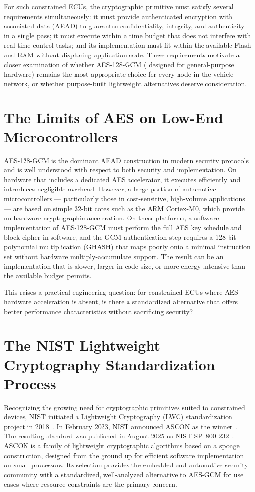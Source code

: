 For such constrained ECUs, the cryptographic primitive must satisfy several
requirements simultaneously: it must provide authenticated encryption with
associated data (AEAD) to guarantee confidentiality, integrity, and authenticity
in a single pass; it must execute within a time budget that does not interfere
with real-time control tasks; and its implementation must fit within the
available Flash and RAM without displacing application code.
These requirements motivate a closer examination of whether AES-128-GCM (
designed for general-purpose hardware) remains the most appropriate choice
for every node in the vehicle network, or whether purpose-built lightweight
alternatives deserve consideration.

\section{The Limits of AES on Low-End Microcontrollers}

AES-128-GCM is the dominant AEAD construction in modern security protocols and
is well understood with respect to both security and implementation.
On hardware that includes a dedicated AES accelerator, it executes efficiently
and introduces negligible overhead.
However, a large portion of automotive microcontrollers --- particularly those
in cost-sensitive, high-volume applications --- are based on simple 32-bit cores
such as the ARM Cortex-M0, which provide no hardware cryptographic acceleration.
On these platforms, a software implementation of AES-128-GCM must perform the
full AES key schedule and block cipher in software, and the GCM authentication
step requires a 128-bit polynomial multiplication (GHASH) that maps poorly onto
a minimal instruction set without hardware multiply-accumulate support.
The result can be an implementation that is slower, larger in code size, or more
energy-intensive than the available budget permits.

This raises a practical engineering question: for constrained ECUs where AES
hardware acceleration is absent, is there a standardized alternative that offers
better performance characteristics without sacrificing security?

\section{The NIST Lightweight Cryptography Standardization Process}

Recognizing the growing need for cryptographic primitives suited to constrained
devices, NIST initiated a Lightweight Cryptography (LWC) standardization project
in 2018~\cite{NISTLWCCall}.
In February 2023, NIST announced \mbox{ASCON} as the winner~\cite{ASCON2023}.
The resulting standard was published in August 2025 as NIST SP~800-232~\cite{NISTSP800232}.
ASCON is a family of lightweight cryptographic algorithms based on a sponge
construction, designed from the ground up for efficient software implementation
on small processors.
Its selection provides the embedded and automotive security community with a
standardized, well-analyzed alternative to AES-GCM for use cases where resource
constraints are the primary concern.

